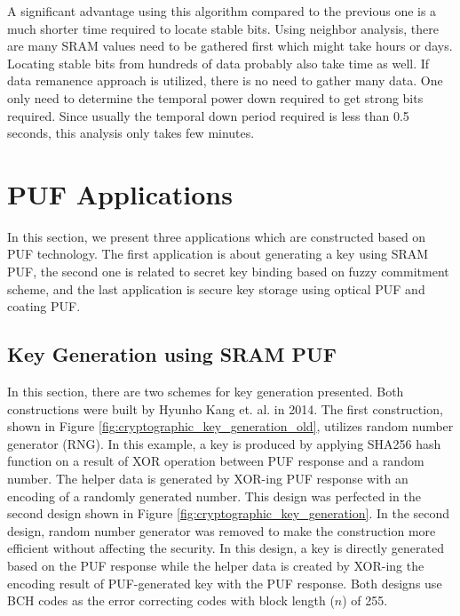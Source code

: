 \begin{enumerate}
A significant advantage using this algorithm compared to the previous one is a much shorter time required to locate stable bits. Using neighbor analysis, there are many SRAM values need to be gathered first which might take hours or days. Locating stable bits from hundreds of data probably also take time as well. If data remanence approach is utilized, there is no need to gather many data. One only need to determine the temporal power down required to get strong bits required. Since usually the temporal down period required is less than 0.5 seconds, this analysis only takes few minutes.
\end{enumerate}

\section{PUF Applications}
In this section, we present three applications which are constructed based on PUF technology. The first application is about generating a key using SRAM PUF, the second one is related to secret key binding based on fuzzy commitment scheme, and the last application is secure key storage using optical PUF and coating PUF.

\subsection{Key Generation using SRAM PUF}

In this section, there are two schemes for key generation presented. Both constructions were built by Hyunho Kang et. al. in 2014. The first construction, shown in Figure \ref{fig:cryptographic_key_generation_old}, utilizes random number generator (RNG). In this example, a key is produced by applying SHA256 hash function on a result of XOR operation between PUF response and a random number. The helper data is generated by XOR-ing PUF response with an encoding of a randomly generated number.
This design was perfected in the second design shown in Figure \ref{fig:cryptographic_key_generation}. In the second design, random number generator was removed to make the construction more efficient without affecting the security. In this design, a key is directly generated based on the PUF response while the helper data is created by XOR-ing the encoding result of PUF-generated key with the PUF response.
Both designs use BCH codes as the error correcting codes with block length ($n$) of 255.

